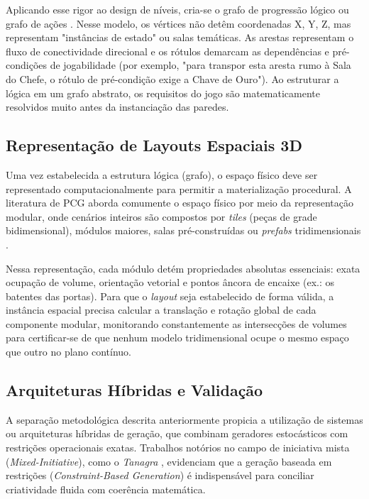 Aplicando esse rigor ao design de níveis, cria-se o grafo de progressão lógico ou grafo de ações \cite{inproceedings}. Nesse modelo, os vértices não detêm coordenadas X, Y, Z, mas representam "instâncias de estado" ou salas temáticas. As arestas representam o fluxo de conectividade direcional e os rótulos demarcam as dependências e pré-condições de jogabilidade (por exemplo, "para transpor esta aresta rumo à Sala do Chefe, o rótulo de pré-condição exige a Chave de Ouro"). Ao estruturar a lógica em um grafo abstrato, os requisitos do jogo são matematicamente resolvidos muito antes da instanciação das paredes.

\subsection{Representação de Layouts Espaciais 3D}
\label{sec:layout_3d}

Uma vez estabelecida a estrutura lógica (grafo), o espaço físico deve ser representado computacionalmente para permitir a materialização procedural. A literatura de PCG aborda comumente o espaço físico por meio da representação modular, onde cenários inteiros são compostos por \textit{tiles} (peças de grade bidimensional), módulos maiores, salas pré-construídas ou \textit{prefabs} tridimensionais \cite{linden2014dungeons}.

Nessa representação, cada módulo detém propriedades absolutas essenciais: exata ocupação de volume, orientação vetorial e pontos âncora de encaixe (ex.: os batentes das portas). Para que o \textit{layout} seja estabelecido de forma válida, a instância espacial precisa calcular a translação e rotação global de cada componente modular, monitorando constantemente as intersecções de volumes para certificar-se de que nenhum modelo tridimensional ocupe o mesmo espaço que outro no plano contínuo.

\subsection{Arquiteturas Híbridas e Validação}
\label{sec:arquiteturas_hibridas}

A separação metodológica descrita anteriormente propicia a utilização de sistemas ou arquiteturas híbridas de geração, que combinam geradores estocásticos com restrições operacionais exatas. Trabalhos notórios no campo de iniciativa mista (\textit{Mixed-Initiative}), como o \textit{Tanagra} \cite{tanagra}, evidenciam que a geração baseada em restrições (\textit{Constraint-Based Generation}) é indispensável para conciliar criatividade fluida com coerência matemática.

